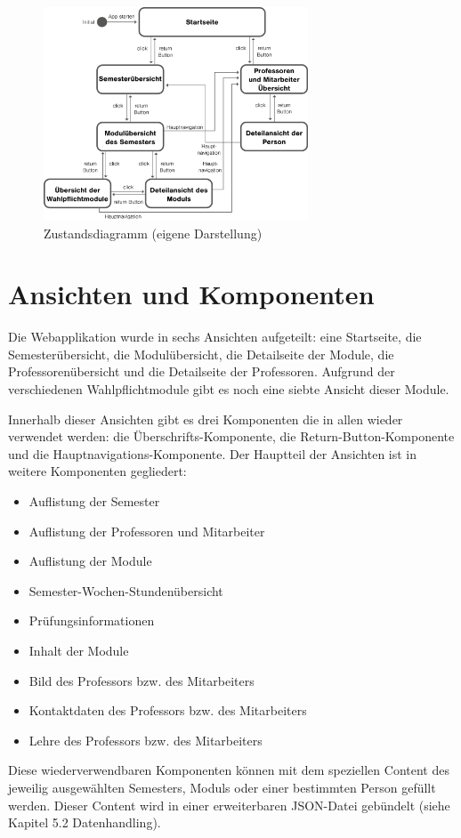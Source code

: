 \documentclass[12pt,					%
							 oneside,			%
							 a4paper,			%
							 halfparskip,		%
							 liststotoc,			%
							 bibtotoc,			%
							 fleqn,				%
							 pointlessnumbers]	%
							 {scrreprt}
\begin{document}
		\begin{figure}[h]
			\centering
			\includegraphics[width=0.7\textwidth]{pictures/zustandsdiagram.png}
			\caption{Zustandsdiagramm (eigene Darstellung)}						
			\label{Zustandsdiagramm}
		\end{figure}
					
		\section{Ansichten und Komponenten}	
		 Die Webapplikation wurde in sechs Ansichten aufgeteilt: eine Startseite, die Semesterübersicht, die Modulübersicht, die Detailseite der Module, die Professorenübersicht und die Detailseite der Professoren. Aufgrund der verschiedenen Wahlpflichtmodule gibt es noch eine siebte Ansicht dieser Module.
	
Innerhalb dieser Ansichten gibt es drei Komponenten die in allen wieder verwendet werden: die Überschrifts-Komponente, die Return-Button-Komponente und die Hauptnavigations-Komponente. Der Hauptteil der Ansichten ist in weitere Komponenten gegliedert:
	\begin{itemize}
		\item Auflistung der Semester
		\item Auflistung der Professoren und Mitarbeiter
		\item Auflistung der Module
		\item Semester-Wochen-Stundenübersicht
		\item Prüfungsinformationen
		\item Inhalt der Module
		\item Bild des Professors bzw. des Mitarbeiters
		\item Kontaktdaten des Professors bzw. des Mitarbeiters
		\item Lehre des Professors bzw. des Mitarbeiters
	\end{itemize}	
Diese wiederverwendbaren Komponenten können mit dem speziellen Content des jeweilig ausgewählten Semesters, Moduls oder einer bestimmten Person gefüllt werden. Dieser Content wird in einer erweiterbaren JSON-Datei gebündelt (siehe Kapitel 5.2 Datenhandling).
\end{document}
